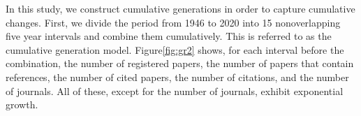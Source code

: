 In this study, we construct cumulative generations in order to capture cumulative changes. First, we divide the period from 1946 to 2020 into 15 nonoverlapping  five year intervals and combine them cumulatively. This is referred to as the cumulative generation model. Figure\ref{fig:gr2} shows, for each interval before the combination, the number of registered papers, the number of papers that contain references, the number of cited papers, the number of citations, and the number of journals. All of these, except for the number of journals, exhibit exponential growth.
